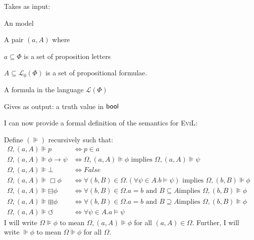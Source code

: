 \begin{itemizedot}
  \item Takes as input:
\begin{itemizedot}
  \item An \evil model
  
  \item A pair $(a, A)$ where
  \begin{itemizedot}
    \item $a\subseteq \Phi$ is a set of proposition letters
    
    \item $A\subseteq \mathcal{L}_0 (\Phi)$ is a set of propositional formulae.
  \end{itemizedot}
  \item A formula in the language $\mathcal{L} (\Phi)$
  \end{itemizedot}
  \item Gives as output: a truth value in $\textup{\textsf{bool}}$
\end{itemizedot}
I can now provide a formal definition of the semantics for \textsc{EviL}:
\begin{definition}
 Define $(\VDash)$ recursively such that:
\begin{align*}
  {\Omega},(a,A){\VDash} p & {\iff}p{\in}a\\
  {\Omega},(a,A){\VDash} {\phi}{\rightarrow}{\psi} &
  {\iff}{\Omega},(a,A){\VDash}{\phi}\text{ implies
  }{\Omega},(a,A){\VDash}{\psi}\\
  {\Omega},(a,A){\VDash}{\bot} & {\iff} False\\
  {\Omega},(a,A){\VDash}\Box {\phi} & {\iff}{\forall}(b,B){\in}{\Omega}.
  ({\forall}{\psi}{\in}A. b{\models}{\psi})\text{ implies
  }{\Omega},(b,B){\VDash}{\phi}\\
  {\Omega},(a,A){\VDash}{\boxminus}{\phi} &
  {\iff}{\forall}(b,B){\in}{\Omega}. a=b\text{ and }B{\subseteq}A\text{
  implies }{\Omega},(b,B){\VDash}{\phi}\\
  {\Omega},(a,A){\VDash}{\boxplus}{\phi} &
  {\iff}{\forall}(b,B){\in}{\Omega}. a=b\text{ and }B{\supseteq}A\text{
  implies }{\Omega},(b,B){\VDash}{\phi}\\
  {\Omega},(a,A){\VDash}{\circlearrowleft} & {\iff}
  {\forall}{\psi}{\in}A.a{\models}{\psi}
\end{align*}
I will write $\Omega \VDash \phi$ to mean $\Omega, (a,A) \VDash \phi$ for all $(a,A) \in \Omega$.  Further, I will write $\VDash \phi$ to mean $\Omega \VDash \phi$ for all $\Omega$.
\end{definition}
